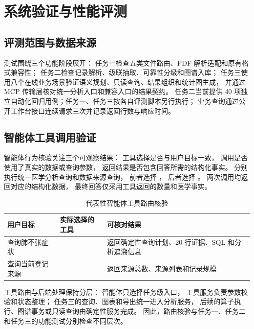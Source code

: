\chapter{系统验证与性能评测}
\label{chap:testing}

\section{评测范围与数据来源}

测试围绕三个功能阶段展开：
任务一检查五类文件路由、PDF 解析适配和原有格式兼容性；
任务二检查记录解析、级联抽取、可靠性分级和图谱入库；
任务三使用八个在线业务场景验证语义规划、只读查询、结果组织和统计图生成，
并通过 MCP 传输层核对统一分析入口和兼容入口的结果契约。
任务二当前提供 40 项独立自动化回归用例；任务一、任务三按各自评测脚本另行执行；
业务查询通过公开工作台接口连续请求三次并记录返回行数与响应时间。

\section{智能体工具调用验证}

智能体行为核验关注三个可观察结果：
工具选择是否与用户目标一致，
调用是否使用了真实的数据或查询参数，
返回结果是否包含回答所需的结构化事实。
分别执行统一医学分析查询和数据来源查询，
前者选择 ，
后者选择 。
两次调用均返回对应的结构化数据，
最终回答仅采用工具返回的数量和医学事实。

\begin{table}[H]
\centering
\caption{代表性智能体工具路由核验}
\label{tab:agent-route-check}
\begin{tabularx}{\textwidth}{L{3.3cm}L{4.0cm}Y}
\toprule
\textbf{用户目标} & \textbf{实际选择的工具} & \textbf{可核对结果} \\
\midrule
查询肺不张症状 &  &
返回确定性查询计划、20 行证据、SQL 和分析追溯信息 \\
查询当前登记来源 &  &
返回来源总数、来源列表和记录规模 \\
\bottomrule
\end{tabularx}
\end{table}

工具路由与后端处理保持分层：
智能体只选择任务级入口，
工具服务负责参数校验和状态整理；
任务三的查询、图表和导出统一进入分析服务，
后续的算子执行、图谱事务或只读查询由确定性服务完成。
因此，路由核验与任务一、任务二和任务三的功能测试分别检查不同层次。

